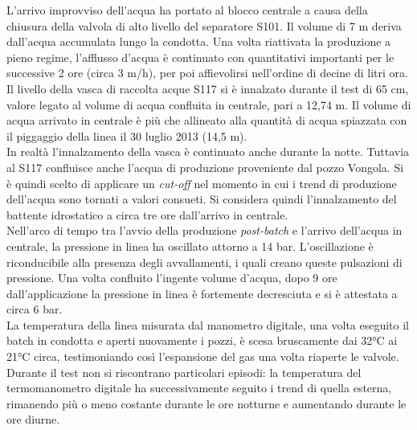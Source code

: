 L'arrivo improvviso dell'acqua ha portato al blocco centrale a causa della chiusura della valvola di alto livello del separatore S101. Il volume di 7 m deriva dall'acqua accumulata lungo la condotta. Una volta riattivata la produzione a pieno regime, l'afflusso d'acqua è continuato con quantitativi importanti per le successive 2 ore (circa 3 m/h), per poi affievolirsi nell'ordine di decine di litri ora. Il livello della vasca di raccolta acque S117 si è innalzato durante il test di 65 cm, valore legato al volume di acqua confluita in centrale, pari a 12,74 m. Il volume di acqua arrivato in centrale è più che allineato alla quantità di acqua spiazzata con il piggaggio della linea il 30 luglio 2013 (14,5 m).\\
In realtà l'innalzamento della vasca è continuato anche durante la notte. Tuttavia al S117 confluisce anche l'acqua di produzione proveniente dal pozzo Vongola. Si è quindi scelto di applicare un \textit{cut-off} nel momento in cui i trend di produzione dell'acqua sono tornati a valori consueti. Si considera quindi l'innalzamento del battente idrostatico a circa tre ore dall'arrivo in centrale.\\
Nell'arco di tempo tra l'avvio della produzione \textit{post-batch} e l'arrivo dell'acqua in centrale, la pressione in linea ha oscillato attorno a 14 bar. L'oscillazione è riconducibile alla presenza degli avvallamenti, i quali creano queste pulsazioni di pressione. Una volta confluito l'ingente volume d'acqua, dopo 9 ore dall'applicazione la pressione in linea è fortemente decresciuta e si è attestata a circa 6 bar. \\
La temperatura della linea misurata dal manometro digitale, una volta eseguito il batch in condotta e aperti nuovamente i pozzi, è scesa bruscamente dai 32°C ai 21°C circa, testimoniando così l'espansione del gas una volta riaperte le valvole. Durante il test non si riscontrano particolari episodi: la temperatura del termomanometro digitale ha successivamente seguito i trend di quella esterna, rimanendo più o meno costante durante le ore notturne e aumentando durante le ore diurne.\\

